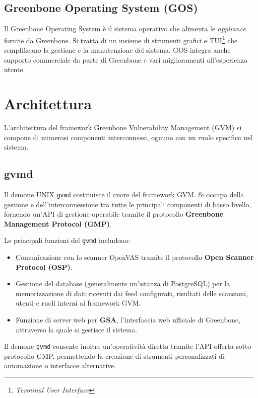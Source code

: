 \subsection{Greenbone Operating System (GOS)}
Il Greenbone Operating System è il sistema operativo che alimenta le \emph{appliance} fornite da Greenbone. Si tratta di un insieme di strumenti grafici e TUI\footnote{\emph{Terminal User Interface}} che semplificano la gestione e la manutenzione del sistema. GOS integra anche supporto commerciale da parte di Greenbone e vari miglioramenti all'esperienza utente.

\section{Architettura}
L'architettura del framework Greenbone Vulnerability Management (GVM) si compone di numerosi componenti interconnessi, ognuno con un ruolo specifico nel sistema.

\subsection{gvmd}
Il demone UNIX \texttt{gvmd} costituisce il cuore del framework GVM. Si occupa della gestione e dell'interconnessione tra tutte le principali componenti di basso livello, fornendo un'API di gestione operabile tramite il protocollo \textbf{Greenbone Management Protocol (GMP)}.
\label{gmp}

Le principali funzioni del \texttt{gvmd} includono:
\begin{itemize}
    \item Comunicazione con lo scanner OpenVAS tramite il protocollo \textbf{Open Scanner Protocol (OSP)}.
    \item Gestione del database (generalmente un'istanza di PostgreSQL) per la memorizzazione di dati ricevuti dai feed configurati, risultati delle scansioni, utenti e ruoli interni al framework GVM.
    \item Funzione di server web per \textbf{GSA}, l'interfaccia web ufficiale di Greenbone, attraverso la quale si gestisce il sistema.
\end{itemize}

Il demone \texttt{gvmd} consente inoltre un'operatività diretta tramite l'API offerta sotto protocollo GMP, permettendo la creazione di strumenti personalizzati di automazione o interfacce alternative.

